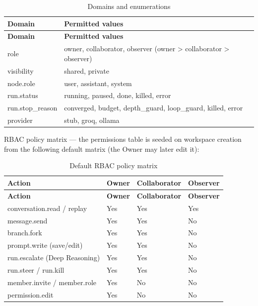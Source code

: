 \documentclass[12pt,a4paper]{report}
\begin{document}
\begingroup
\setlength{\parskip}{0pt}\renewcommand{\arraystretch}{1.32}\footnotesize
\begin{xltabular}{\textwidth}{>{\hsize\raggedright\arraybackslash}X >{\hsize\raggedright\arraybackslash}X}
\caption{Domains and enumerations}\\
\toprule
\textbf{Domain} & \textbf{Permitted values} \\
\midrule\endfirsthead
\toprule
\textbf{Domain} & \textbf{Permitted values} \\
\midrule\endhead
\bottomrule\endfoot
role & owner, collaborator, observer (owner > collaborator > observer) \\
visibility & shared, private \\
node.role & user, assistant, system \\
run.status & running, paused, done, killed, error \\
run.stop\_reason & converged, budget, depth\_guard, loop\_guard, killed, error \\
provider & stub, groq, ollama \\
\end{xltabular}
\endgroup

RBAC policy matrix --- the permissions table is seeded on workspace creation from the following default matrix (the Owner may later edit it):

\begingroup
\setlength{\parskip}{0pt}\renewcommand{\arraystretch}{1.32}\footnotesize
\begin{xltabular}{\textwidth}{>{\hsize\raggedright\arraybackslash}X >{\hsize\centering\arraybackslash}X >{\hsize\centering\arraybackslash}X >{\hsize\centering\arraybackslash}X}
\caption{Default RBAC policy matrix}\\
\toprule
\textbf{Action} & \textbf{Owner} & \textbf{Collaborator} & \textbf{Observer} \\
\midrule\endfirsthead
\toprule
\textbf{Action} & \textbf{Owner} & \textbf{Collaborator} & \textbf{Observer} \\
\midrule\endhead
\bottomrule\endfoot
conversation.read / replay & Yes & Yes & Yes \\
message.send & Yes & Yes & No \\
branch.fork & Yes & Yes & No \\
prompt.write (save/edit) & Yes & Yes & No \\
run.escalate (Deep Reasoning) & Yes & Yes & No \\
run.steer / run.kill & Yes & Yes & No \\
member.invite / member.role & Yes & No & No \\
permission.edit & Yes & No & No \\
\end{xltabular}
\endgroup
\end{document}
